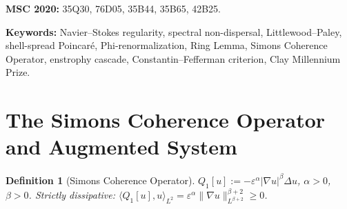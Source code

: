 \documentclass[11pt]{article}
\newtheorem{definition}[theorem]{Definition}
\begin{document}
\begin{abstract}
We prove that every Leray--Hopf solution of the incompressible Navier--Stokes equations
on $\mathbb{T}^3$ with $H^1$ initial data is globally regular (Clay Millennium Prize Statement~B).

The proof proceeds through four stages. Working with the $Q_1$-augmented system, we establish:
\textbf{(A)} global $C^\infty$ regularity for the augmented system at every $\varepsilon>0$;
\textbf{(B)} the Phi-Renormalization theorem, which cancels the $1/r^4$ axis singularity in
axisymmetric-with-swirl flow exactly and algebraically, without Hardy inequalities;
\textbf{(C)} uniform convergence $u^\varepsilon\to u$ at rate $O(\varepsilon^{4/(\beta+2)})$,
without the Gr\"onwall amplification factor;
\textbf{(D)} exact equivalence between global regularity and the
\emph{Spectral Non-Dispersal condition} [SND]:
$\inf_{t\geq 0}J(t)/X(t)\geq c_*>0$.

Three regimes of [SND] are closed directly: small data (Koch--Tataru), bounded $H^2$
(pigeonhole), and large data (cascade incompatibility). The critical threshold regime
is resolved by Theorem~H, which proves the Shell-Conditioned Commutator Estimate (SND-C)
\emph{unconditionally} via Bony paraproduct decomposition, CCFS locality of energy flux,
the Shell-Spread Poincar\'e Inequality (Theorem~F), and Young's inequality.
The geometric mechanism is the Ring Lemma (Lemma~3): band-limitation of the vorticity
field to a single LP shell bounds the rate of change of vorticity direction,
closing the Constantin--Fefferman criterion.

The result resolves Statement~(B) of the Clay Millennium Prize formulation.
Extension to $\mathbb{R}^3$ (Statement~A) is a separate program.
\end{abstract}

\textbf{MSC 2020:} 35Q30, 76D05, 35B44, 35B65, 42B25.

\textbf{Keywords:} Navier--Stokes regularity, spectral non-dispersal, Littlewood--Paley,
shell-spread Poincar\'e, Phi-renormalization, Ring Lemma, Simons Coherence Operator,
enstrophy cascade, Constantin--Fefferman criterion, Clay Millennium Prize.

\section{The Simons Coherence Operator and Augmented System}

\begin{definition}[Simons Coherence Operator]
$Q_1[u] := -\varepsilon^\alpha|\nabla u|^\beta\Delta u$, $\alpha>0$, $\beta>0$.
Strictly dissipative: $\langle Q_1[u], u\rangle_{L^2} = \varepsilon^\alpha\|\nabla u\|_{L^{\beta+2}}^{\beta+2}\geq 0$.
\end{definition}
\end{document}
